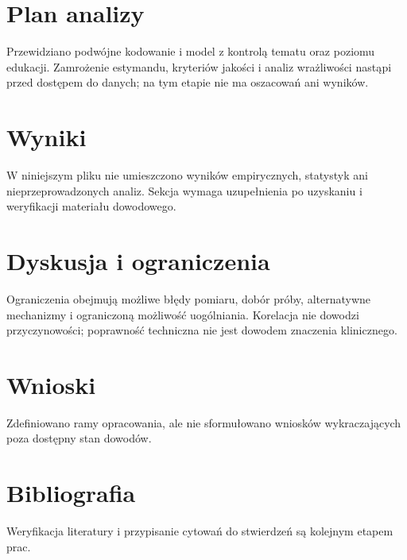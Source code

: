 \documentclass[11pt,a4paper]{article}
\begin{document}
\section{Plan analizy}

Przewidziano podwójne kodowanie i model z kontrolą tematu oraz poziomu edukacji. Zamrożenie estymandu, kryteriów jakości i analiz wrażliwości nastąpi przed dostępem do danych; na tym etapie nie ma oszacowań ani wyników.

\section{Wyniki}

W niniejszym pliku nie umieszczono wyników empirycznych, statystyk ani nieprzeprowadzonych analiz. Sekcja wymaga uzupełnienia po uzyskaniu i weryfikacji materiału dowodowego.

\section{Dyskusja i ograniczenia}

Ograniczenia obejmują możliwe błędy pomiaru, dobór próby, alternatywne mechanizmy i ograniczoną możliwość uogólniania. Korelacja nie dowodzi przyczynowości; poprawność techniczna nie jest dowodem znaczenia klinicznego.

\section{Wnioski}

Zdefiniowano ramy opracowania, ale nie sformułowano wniosków wykraczających poza dostępny stan dowodów.

\section*{Bibliografia}

Weryfikacja literatury i przypisanie cytowań do stwierdzeń są kolejnym etapem prac.
\end{document}
